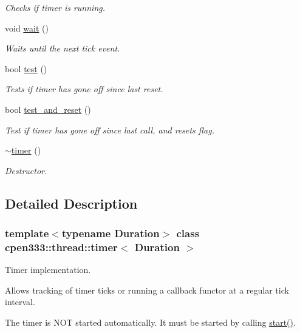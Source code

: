 \begin{DoxyCompactItemize}
\begin{DoxyCompactList}\small\item\em Checks if timer is running. \end{DoxyCompactList}\item 
void \hyperlink{classcpen333_1_1thread_1_1timer_aecbb193d8d58a41488881fd795aac9e1}{wait} ()
\begin{DoxyCompactList}\small\item\em Waits until the next tick event. \end{DoxyCompactList}\item 
bool \hyperlink{classcpen333_1_1thread_1_1timer_af81a4656b66d8bebd7497ffe826f4373}{test} ()
\begin{DoxyCompactList}\small\item\em Tests if timer has gone off since last reset. \end{DoxyCompactList}\item 
bool \hyperlink{classcpen333_1_1thread_1_1timer_a6fc134f093e0ff35ef1baebefd62ed8b}{test\+\_\+and\+\_\+reset} ()
\begin{DoxyCompactList}\small\item\em Test if timer has gone off since last call, and resets flag. \end{DoxyCompactList}\item 
\hyperlink{classcpen333_1_1thread_1_1timer_a4c25e491b57438c7a60fe54b45b369b8}{$\sim$timer} ()
\begin{DoxyCompactList}\small\item\em Destructor. \end{DoxyCompactList}\end{DoxyCompactItemize}


\subsection{Detailed Description}
\subsubsection*{template$<$typename Duration$>$\newline
class cpen333\+::thread\+::timer$<$ Duration $>$}

Timer implementation. 

Allows tracking of timer ticks or running a callback functor at a regular tick interval.

The timer is N\+OT started automatically. It must be started by calling \hyperlink{classcpen333_1_1thread_1_1timer_a0d1be90402f46912966ec5fc13707bce}{start()}.


